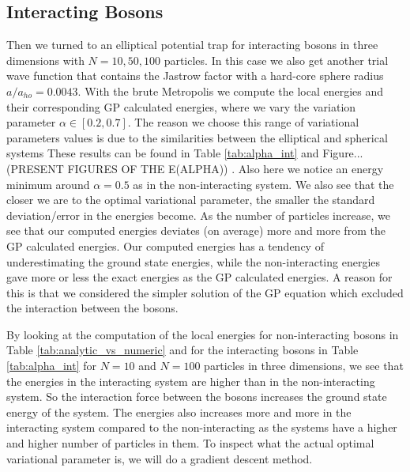 \documentclass[12pt,a4paper,english]{article}
\begin{document}
\subsection{Interacting Bosons}
\label{subsect:Results_int}
Then we turned to an elliptical potential trap for interacting bosons in three dimensions with $N=10,50,100$ particles. In this case we also get another trial wave function that contains the Jastrow factor with a hard-core sphere radius $a/a_{ho}=0.0043$. With the brute Metropolis we compute the local energies and their corresponding GP calculated energies, where we vary the variation parameter $\alpha\in[0.2,0.7]$. The reason we choose this range of variational parameters values is due to the similarities between the elliptical and spherical systems These results can be found in Table \ref{tab:alpha_int} and Figure...(PRESENT FIGURES OF THE E(ALPHA)) . Also here we notice an energy minimum around $\alpha=0.5$ as in the non-interacting system. We also see that the closer we are to the optimal variational parameter, the smaller the standard deviation/error in the energies become. As the number of particles increase, we see that our computed energies deviates (on average) more and more from the GP calculated energies. Our computed energies has a tendency of underestimating the ground state energies, while the non-interacting energies gave more or less the exact energies as the GP calculated energies. A reason for this is that we considered the simpler solution of the GP equation which excluded the interaction between the bosons.

By looking at the computation of the local energies for non-interacting bosons in Table \ref{tab:analytic_vs_numeric} and for the interacting bosons in Table \ref{tab:alpha_int} for $N=10$ and $N=100$ particles in three dimensions, we see that the energies in the interacting system are higher than in the non-interacting system. So the interaction force between the bosons increases the ground state energy of the system. The energies also increases more and more in the interacting system compared to the non-interacting as the systems have a higher and higher number of particles in them. To inspect what the actual optimal variational parameter is, we will do a gradient descent method.
\end{document}
